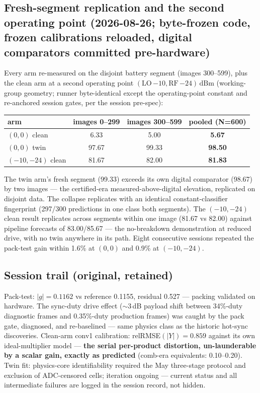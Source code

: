 \documentclass[11pt]{article}
\newcommand{\dbm}{\ensuremath{\,\mathrm{dBm}}}
\begin{document}
\subsection*{Fresh-segment replication and the second operating point
(2026-08-26; byte-frozen code, frozen calibrations reloaded, digital
comparators committed pre-hardware)}
Every arm re-measured on the disjoint battery segment (images
300--599), plus the clean arm at a second operating point
$(\mathrm{LO}\,{-10},\mathrm{RF}\,{-24})$\dbm{} (working-group
geometry; runner byte-identical except the operating-point constant
and re-anchored session gates, per the session pre-spec):
\begin{center}
\begin{tabular}{lccc}
\toprule
arm & images 0--299 & images 300--599 & pooled (N=600)\\
\midrule
$(0,0)$ clean & 6.33 & 5.00 & \textbf{5.67}\\
$(0,0)$ twin  & 97.67 & 99.33 & \textbf{98.50}\\
$(-10,-24)$ clean & 81.67 & 82.00 & \textbf{81.83}\\
\bottomrule
\end{tabular}
\end{center}
The twin arm's fresh segment (99.33) exceeds its own digital
comparator (98.67) by two images --- the certified-era
measured-above-digital elevation, replicated on disjoint data. The
collapse replicates with an identical constant-classifier fingerprint
(297/300 predictions in one class both segments). The $(-10,-24)$
clean result replicates across segments within one image (81.67 vs
82.00) against pipeline forecasts of 83.00/85.67 --- the
no-breakdown demonstration at reduced drive, with no twin anywhere in
its path. Eight consecutive sessions repeated the pack-test gain
within 1.6\% at $(0,0)$ and 0.9\% at $(-10,-24)$.

\subsection*{Session trail (original, retained)}
Pack-test: $|g|=0.1162$ vs reference 0.1155, residual 0.527 ---
packing validated on hardware. The sync-duty drive effect
($\sim$3\,dB payload shift between 34\%-duty diagnostic frames and
0.35\%-duty production frames) was caught by the pack gate,
diagnosed, and re-baselined --- same physics class as the historic
hot-sync discoveries. Clean-arm conv1 calibration:
relRMSE$(|Y|)=0.859$ against its own ideal-multiplier model ---
\textbf{the serial per-product distortion, un-launderable by a scalar
gain, exactly as predicted} (comb-era equivalents: 0.10--0.20). Twin
fit: physics-core identifiability required the May three-stage
protocol and exclusion of ADC-censored cells; iteration ongoing ---
current status and all intermediate failures are logged in the
session record, not hidden.
\end{document}
